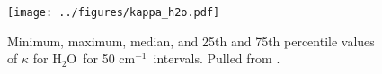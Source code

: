 \documentclass[10pt]{article}
\newcommand{\eqnref}[1]{(\ref{#1})}
\newcommand{\ppz}{\ensuremath{\partial_z}}
\newcommand{\htwo}{\ensuremath{\mathrm{H_2O}}}
\newcommand{\FLW}{\ensuremath{F^\mathrm{LW}}}
\newcommand{\FSW}{\ensuremath{F^\mathrm{SW}}}
\newcommand{\USW}{\ensuremath{U^\mathrm{SW}}}
\newcommand{\DSW}{\ensuremath{D^\mathrm{SW}}}
\newcommand{\Fnet}{\ensuremath{F^\mathrm{net}}}
\newcommand{\cminverse}{\ensuremath{\mathrm{cm^{-1}}}}
\newcommand{\Ts}{\ensuremath{T_\mathrm{s}}}
\begin{document}
\begin{figure}[h]
        \begin{center}
                        \texttt{[image: ../figures/kappa\_h2o.pdf]}
                \caption{Minimum, maximum, median, and 25th and 75th percentile 
values of $\kappa$ for \htwo\ for 50 \cminverse\ intervals. Pulled from \cite{pierrehumbert2010}.
                \label{kappa_h2o}
                }
        \end{center}
\end{figure}




%



%
\end{document}
